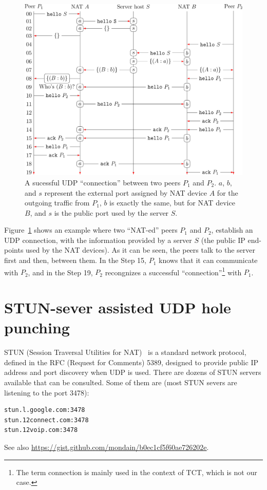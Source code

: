 \begin{figure}
  \includegraphics{graphics/UDP_Hole_Punching_RCN}
  \caption{A sucessful UDP ``connection'' between two peers $P_1$ and
    $P_2$. $a$, $b$, and $s$ represent the external port assigned by
    NAT device $A$ for the outgoing traffic from $P_1$, $b$ is exactly
    the same, but for NAT device $B$, and $s$ is the public port used
    by the server $S$.}
  \label{fig:UHP}
\end{figure}

Figure~\ref{fig:UHP} shows an example where two ``NAT-ed'' peers $P_1$
and $P_2$, establish an UDP connection, with the information provided
by a server $S$ (the public IP end-points used by the NAT devices). As
it can be seen, the peers talk to the server first and then, between
them. In the Step 15, $P_1$ knows that it can communicate with $P_2$,
and in the Step 19, $P_2$ recongnizes a successful
``connection''\footnote{The term connection is mainly used in the
  context of TCT, which is not our case.} with $P_1$.

\section{STUN-sever assisted UDP hole punching}

STUN (Session Traversal Utilities for NAT)~\cite{STUN} is a standard
network protocol, defined in the RFC (Request for Comments) 5389,
designed to provide public IP address and port discovery when UDP is
used. There are dozens of STUN servers available that can be
consulted. Some of them are (most STUN severs are listening to the
port 3478):
\begin{verbatim}
stun.l.google.com:3478
stun.12connect.com:3478
stun.12voip.com:3478
\end{verbatim}
See also \url{https://gist.github.com/mondain/b0ec1cf5f60ae726202e}.


